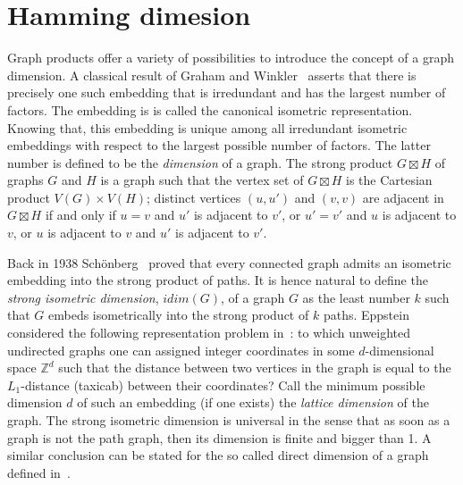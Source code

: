 \documentclass[12pt,a4paper,titlepage,openany]{report}
\begin{document}
\chapter{Hamming dimesion}\label{hdim-chapter}
Graph products offer a variety of possibilities to introduce the concept of a graph dimension. A classical result of Graham and Winkler~\cite{Graham} asserts that there is precisely one such embedding that is irredundant and has the largest number of factors. The embedding is is called the canonical isometric representation. Knowing that, this embedding is unique among all irredundant isometric embeddings with respect to the largest possible number of factors. The latter number is defined to be the \emph{dimension} of a graph. 
\newline The strong product $G\boxtimes H$ of graphs $G$ and $H$ is a graph such that the vertex set of $G\boxtimes H$ is the Cartesian product $V(G) \times V(H)$; distinct vertices $(u,u')$ and $(v,v)$ are adjacent in $G\boxtimes  H$ if and only if $u = v$ and $u'$ is adjacent to $v'$, or $u' = v'$ and $u$ is adjacent to $v$, or $u$ is adjacent to $v$ and $u'$ is adjacent to $v'$.

 Back in 1938 Sch\" onberg~\cite{Schonber} proved that every connected graph admits an isometric embedding into the strong product of paths. It is hence natural to define the \textit{strong isometric dimension}, $idim(G)$, of a graph $G$ as the least number $k$ such that $G$ embeds isometrically into the strong product of $k$ paths.\newline
Eppstein considered the following representation problem in~\cite{David}: to which unweighted undirected graphs one can assigned integer coordinates in some $d$-dimensional space $\mathbb{Z}^d$ such that the distance between two vertices in the graph is equal to the $L_1$-distance (taxicab) between their coordinates? Call the minimum possible dimension $d$ of such an embedding (if one exists) the \textit{lattice dimension} of the graph.\newline
The strong isometric dimension is universal in the sense that as soon as a graph is not the path graph, then its dimension is finite and bigger than 1. A similar conclusion can be stated for the so called direct dimension of a graph defined in~\cite{Eaton}.
\end{document}

